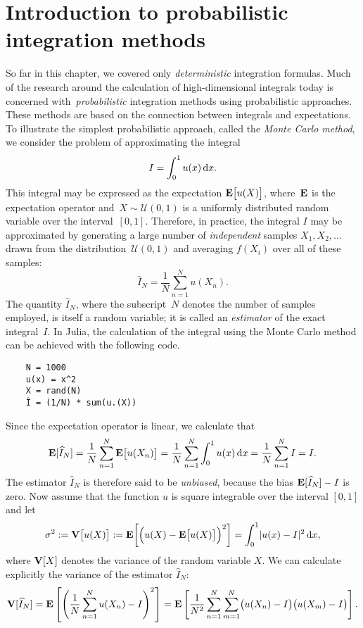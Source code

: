 \section{Introduction to probabilistic integration methods}
So far in this chapter,
we covered only \emph{deterministic} integration formulas.
Much of the research around the calculation of high-dimensional integrals today is concerned with~\emph{probabilistic} integration methods using probabilistic approaches.
These methods are based on the connection between integrals and expectations.
To illustrate the simplest probabilistic approach,
called the \emph{Monte Carlo method},
we consider the problem of approximating the integral
\[
    I = \int_{0}^{1} u(x) \, \mathrm d x.
\]
This integral may be expressed as the expectation $\mathbf E \bigl[u(X)\bigr]$,
where~$\mathbf E$ is the expectation operator and~$X \sim \mathcal U(0, 1)$ is a uniformly distributed random variable over the interval~$[0, 1]$.
Therefore, in practice,
the integral $I$ may be approximated by generating a large number of \emph{independent} samples $X_1, X_2,\dotsc$ drawn from the distribution~$\mathcal U(0, 1)$
and averaging $f(X_i)$ over all of these samples:
\[
    \widehat I_N = \frac{1}{N} \sum_{n=1}^{N} u(X_n).
\]
The quantity $\widehat I_N$,
where the subscript~$N$ denotes the number of samples employed,
is itself a random variable;
it is called an \emph{estimator} of the exact integral~$I$.
In Julia, the calculation of the integral using the Monte Carlo method can be achieved with the following code.
\begin{verbatim}
    N = 1000
    u(x) = x^2
    X = rand(N)
    Î = (1/N) * sum(u.(X))
\end{verbatim}
Since the expectation operator is linear,
we calculate that
\[
    \mathbf E[\widehat I_N] = \frac{1}{N} \sum_{n=1}^{N} \mathbf E \bigl[u(X_n)\bigr] = \frac{1}{N} \sum_{n=1}^{N} \int_{0}^{1} u(x) \, \mathrm d x = \frac{1}{N} \sum_{n=1}^{N} I = I.
\]
The estimator $\widehat I_N$ is therefore said to be \emph{unbiased},
because the bias $\mathbf E [\widehat I_N] - I$ is zero.
Now assume that the function $u$ is square integrable over the interval $[0, 1]$ and let
\[
    \sigma^2 := \mathbf V\bigl[u(X)\bigr] := \mathbf E \biggl[ \Bigl(u(X) - \mathbf E \bigl[u(X)\bigr]\Bigr)^2 \biggr]  = \int_{0}^{1} \lvert u(x) - I \rvert^2 \, \mathrm d x,
\]
where $\mathbf V[X]$ denotes the variance of the random variable $X$.
We can calculate explicitly the variance of the estimator $\widehat I_N$:
\begin{align*}
    \mathbf V[\widehat I_N]
    = \mathbf E \left[ \left( \frac{1}{N} \sum_{n=1}^{N} u(X_n) - I \right)^2 \right]
    = \mathbf E \left[ \frac{1}{N^2} \sum_{n=1}^{N} \sum_{m=1}^{N} \bigl(u(X_n) - I\bigr) \bigl(u(X_m) - I\bigr) \right].
\end{align*}
